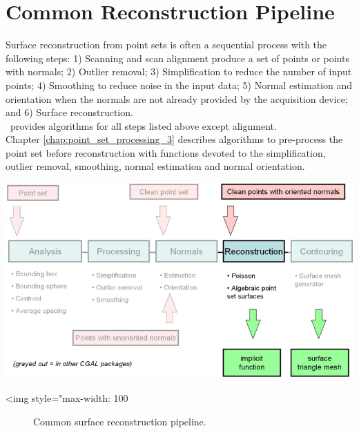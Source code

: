 \section{Common Reconstruction Pipeline}

Surface reconstruction from point sets is often a sequential process with the following steps: 1) Scanning and scan alignment produce a set of points or points with normals; 2) Outlier removal; 3) Simplification to reduce the number of input points; 4) Smoothing to reduce noise in the input data; 5) Normal estimation and orientation when the normals are not already provided by the acquisition device; and 6) Surface reconstruction. \\
\cgal\ provides algorithms for all steps listed above except alignment. \\
Chapter  \ref{chap:point_set_processing_3} describes algorithms to pre-process the point set before reconstruction with functions devoted to the simplification, outlier removal, smoothing, normal estimation and normal orientation.

\begin{center}
    \begin{ccTexOnly}
        \includegraphics[width=1.0\textwidth]{Surface_reconstruction_points_3/pipeline} %
    \end{ccTexOnly}
    \begin{ccHtmlOnly}
        <img style="max-width: 100%
    \end{ccHtmlOnly}
    \begin{figure}[h]
        \caption{Common surface reconstruction pipeline.}
        \label{Surface_reconstruction_points_3-fig-pipeline}
    \end{figure}
\end{center}

